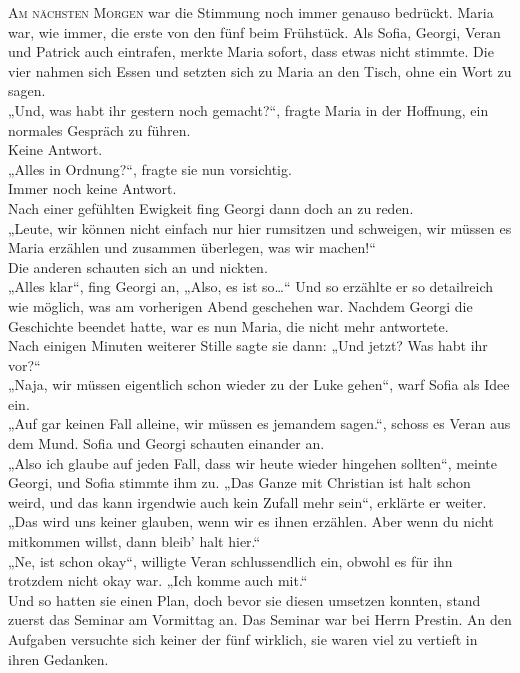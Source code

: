 \documentclass[oneside]{memoir}
\begin{document}
\medskip
\lettrine{A}{m nächsten Morgen} war die Stimmung noch immer genauso bedrückt. Maria war, wie immer, die erste von den fünf beim Frühstück. Als Sofia, Georgi, Veran und Patrick auch eintrafen, merkte Maria sofort, dass etwas nicht stimmte. Die vier nahmen sich Essen und setzten sich zu Maria an den Tisch, ohne ein Wort zu sagen. \\
„Und, was habt ihr gestern noch gemacht?“, fragte Maria in der Hoffnung, ein normales Gespräch zu führen. \\
Keine Antwort. \\
„Alles in Ordnung?“, fragte sie nun vorsichtig. \\
Immer noch keine Antwort. \\
Nach einer gefühlten Ewigkeit fing Georgi dann doch an zu reden. \\
„Leute, wir können nicht einfach nur hier rumsitzen und schweigen, wir müssen es Maria erzählen und zusammen überlegen, was wir machen!“ \\
Die anderen schauten sich an und nickten. \\
„Alles klar“, fing Georgi an, „Also, es ist so\ldots“ Und so erzählte er so detailreich wie möglich, was am vorherigen Abend geschehen war. Nachdem Georgi die Geschichte beendet hatte, war es nun Maria, die nicht mehr antwortete. \\
Nach einigen Minuten weiterer Stille sagte sie dann: „Und jetzt? Was habt ihr vor?“ \\
„Naja, wir müssen eigentlich schon wieder zu der Luke gehen“, warf Sofia als Idee ein. \\
„Auf gar keinen Fall alleine, wir müssen es jemandem sagen.“, schoss es Veran aus dem Mund. Sofia und Georgi schauten einander an. \\
„Also ich glaube auf jeden Fall, dass wir heute wieder hingehen sollten“, meinte Georgi, und Sofia stimmte ihm zu. „Das Ganze mit Christian ist halt schon weird, und das kann irgendwie auch kein Zufall mehr sein“, erklärte er weiter. „Das wird uns keiner glauben, wenn wir es ihnen erzählen. Aber wenn du nicht mitkommen willst, dann bleib' halt hier.“ \\
„Ne, ist schon okay“, willigte Veran schlussendlich ein, obwohl es für ihn trotzdem nicht okay war. „Ich komme auch mit.“ \\
Und so hatten sie einen Plan, doch bevor sie diesen umsetzen konnten, stand zuerst das Seminar am Vormittag an. Das Seminar war bei Herrn Prestin. An den Aufgaben versuchte sich keiner der fünf wirklich, sie waren viel zu vertieft in ihren Gedanken.  \\
\end{document}

